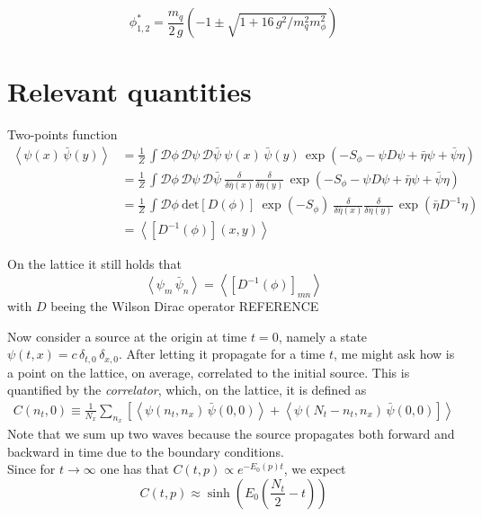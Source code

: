 \begin{equation*}
    \phi^*_{1,2} = \frac{m_q}{2 \, g} \left(-1 \pm \sqrt{1 + 16 \, g^2 / m_q^2 m_\phi^2}\right)
\end{equation*}

\newpage 



\section{Relevant quantities}
Two-points function
\begin{align*}
    \left\langle \psi(x) \, \bar\psi(y) \right\rangle 
    &= \frac{1}{Z} \, \int \mathcal{D}\phi \, \mathcal{D}\psi \, \mathcal{D}\bar\psi \ \psi(x) \, \bar\psi(y) \, \exp \left( - S_\phi - \psi D \psi + \bar\eta \psi + \bar \psi \eta \right) \\
    &= \frac{1}{Z} \, \int \mathcal{D}\phi \, \mathcal{D}\psi \, \mathcal{D}\bar\psi \ \frac{\delta}{\delta \bar \eta(x)} \frac{\delta}{\delta \eta(y)} \, \exp \left( - S_\phi - \psi D \psi + \bar\eta \psi + \bar \psi \eta \right) \\
    &= \frac{1}{Z} \, \int \mathcal{D}\phi \ \text{det}\left[D(\phi)\right] \ \exp \left( - S_\phi \right) \ \frac{\delta}{\delta \bar \eta(x)} \frac{\delta}{\delta \eta(y)} \, \exp\left( \bar\eta D^{-1} \eta \right) \\
    &= \left\langle \left[D^{-1}(\phi)\right](x,y)\right\rangle
\end{align*}

On the lattice it still holds that 
\begin{equation*}
     \left\langle \psi_m \, \bar\psi_n \right\rangle =     \left\langle \left[D^{-1}(\phi)\right]_{mn}\right\rangle
\end{equation*}
with $D$ beeing the Wilson Dirac operator REFERENCE

Now consider a source at the origin at time $t=0$, namely a state $\psi(t,x) = c \, \delta_{t,0} \, \delta_{x,0}$. After letting it propagate for a time $t$, me might ask how is a point on the lattice, on average, correlated to the initial source. This is quantified by the \emph{correlator}, which, on the lattice, it is defined as
\begin{align*}
    C(n_t,0) \equiv \frac{1}{N_x} \sum_{n_x} \left[\left\langle \psi(n_t, n_x) \, \bar\psi(0,0)\right\rangle + \left\langle \psi(N_t-n_t, n_x) \, \bar\psi(0,0) \right] \right\rangle
\end{align*}
Note that we sum up two waves because the source propagates both forward and backward in time due to the boundary conditions. \\
Since for $t \to \infty$ one has that $C(t,p) \propto e^{-E_0(p) t}$, we expect 
\begin{equation*}
    C(t,p) \approx \sinh \left(E_0 \left(\frac{N_t}{2} - t\right)\right)
\end{equation*}

